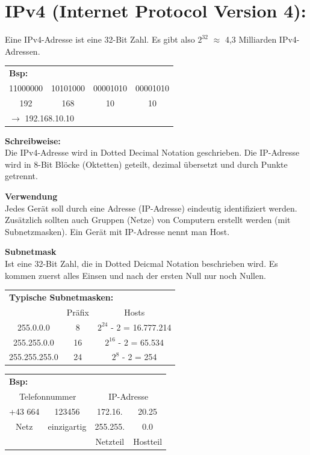 \chapter{IPv4 (Internet Protocol Version 4):}
Eine IPv4-Adresse ist eine 32-Bit Zahl. Es gibt also $2^{32}$ $\approx$ 4,3 Milliarden IPv4-Adressen.

\begin{table}[H]
	\begin{tabular}{c|c|c|c}
		 \multicolumn{4}{l}{\textbf{Bsp:}} \\
		11000000 & 10101000 & 00001010 & 00001010 \\
		192 & 168 & 10 & 10 \\
		 \multicolumn{4}{l}{$\rightarrow$ 192.168.10.10} \\
	\end{tabular}
\end{table}
\textbf{Schreibweise:} \\
Die IPv4-Adresse wird in Dotted Decimal Notation geschrieben. Die IP-Adresse wird in 8-Bit Blöcke (Oktetten) geteilt, dezimal übersetzt und durch Punkte getrennt.

\textbf{Verwendung} \\
Jedes Gerät soll durch eine Adresse (IP-Adresse) eindeutig identifiziert werden. Zusätzlich sollten auch Gruppen (Netze) von Computern erstellt werden (mit Subnetzmasken). Ein Gerät mit IP-Adresse nennt man Host.

\textbf{Subnetmask} \\
Ist eine 32-Bit Zahl, die in Dotted Deicmal Notation beschrieben wird. Es kommen zuerst alles Einsen und nach der ersten Null nur noch Nullen. 
\begin{table}[H]
	\begin{tabular}{c|c|c}
		\multicolumn{3}{l}{\textbf{Typische Subnetmasken:}} \\
		& Präfix & Hosts \\
		\hline
		255.0.0.0 & 8 & $2^{24}$ - 2 = 16.777.214 \\
		\hline
		255.255.0.0 & 16 & $2^{16}$ - 2 = 65.534 \\
		\hline
		255.255.255.0 & 24 & $2^{8}$ - 2 = 254
	\end{tabular}
\end{table}
\begin{table}[H]
	\begin{tabular}{cc|cc}
		\multicolumn{4}{l}{\textbf{Bsp:}} \\
		\multicolumn{2}{c}{Telefonnummer} & \multicolumn{2}{c}{IP-Adresse} \\
		+43 664 & 123456 & 172.16. & 20.25 \\
		Netz & einzigartig & 255.255. & 0.0 \\
		 & & Netzteil & Hostteil
	\end{tabular}
\end{table}

